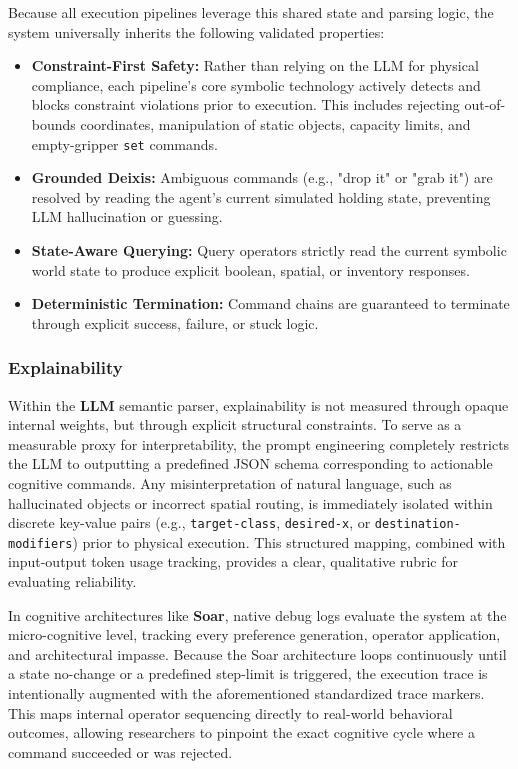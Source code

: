 \documentclass[a4paper]{article}
\begin{document}
Because all execution pipelines leverage this shared state and parsing logic, the system universally inherits the following validated properties:
\begin{itemize}
    \item \textbf{Constraint-First Safety:} Rather than relying on the LLM for physical compliance, each pipeline's core symbolic technology actively detects and blocks constraint violations prior to execution. This includes rejecting out-of-bounds coordinates, manipulation of static objects, capacity limits, and empty-gripper \texttt{set} commands.
    \item \textbf{Grounded Deixis:} Ambiguous commands (e.g., "drop it" or "grab it") are resolved by reading the agent's current simulated holding state, preventing LLM hallucination or guessing.
    \item \textbf{State-Aware Querying:} Query operators strictly read the current symbolic world state to produce explicit boolean, spatial, or inventory responses.
    \item \textbf{Deterministic Termination:} Command chains are guaranteed to terminate through explicit success, failure, or stuck logic.
\end{itemize}

\subsubsection{Explainability}
Within the \textbf{LLM} semantic parser, explainability is not measured through opaque internal weights, but through explicit structural constraints. To serve as a measurable proxy for interpretability, the prompt engineering completely restricts the LLM to outputting a predefined JSON schema corresponding to actionable cognitive commands. Any misinterpretation of natural language, such as hallucinated objects or incorrect spatial routing, is immediately isolated within discrete key-value pairs (e.g., \texttt{target-class}, \texttt{desired-x}, or \texttt{destination-modifiers}) prior to physical execution. This structured mapping, combined with input-output token usage tracking, provides a clear, qualitative rubric for evaluating reliability.

In cognitive architectures like \textbf{Soar}, native debug logs evaluate the system at the micro-cognitive level, tracking every preference generation, operator application, and architectural impasse. Because the Soar architecture loops continuously until a state no-change or a predefined step-limit is triggered, the execution trace is intentionally augmented with the aforementioned standardized trace markers. This maps internal operator sequencing directly to real-world behavioral outcomes, allowing researchers to pinpoint the exact cognitive cycle where a command succeeded or was rejected.
\end{document}
